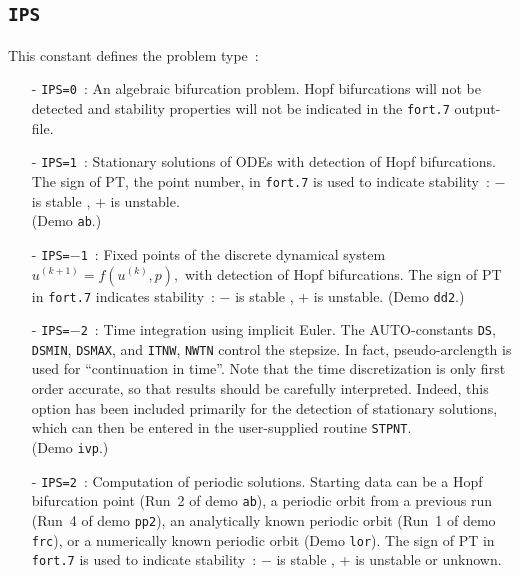 \documentclass[12pt]{report}
\begin{document}
\subsection{\tt IPS}  \label{sec:IPS}
This constant defines the problem type~:
\begin{itemize}
\item[-] {\tt IPS=0}~: 
  An algebraic bifurcation problem.
  Hopf bifurcations will not be detected and stability
  properties will not be indicated in the {\tt fort.7} output-file.
\item[-] {\tt IPS=1}~: 
  Stationary solutions of ODEs with detection of Hopf bifurcations.
  The sign of PT, the point number, in {\tt fort.7} is used 
  to indicate stability~: $-$ is stable , + is unstable.\\
 (Demo {\tt ab}.)
\item[-] {\tt IPS=$-$1}~:  
  Fixed points of the discrete dynamical system
  $u^{(k+1)}=f(u^{(k)},p ),$ with detection of Hopf bifurcations.
  The sign of PT in {\tt fort.7} indicates stability~: 
  $-$ is stable , + is unstable.  
 (Demo {\tt dd2}.)
\item[-] {\tt IPS=$-$2}~: 
  Time integration using implicit Euler. 
  The {\cal AUTO}-constants {\tt DS}, {\tt DSMIN}, {\tt DSMAX}, and {\tt ITNW}, {\tt NWTN} control 
  the stepsize.
  In fact, pseudo-arclength is used for ``continuation in time''. 
  Note that the time discretization is only first order accurate, 
  so that results should be carefully interpreted. 
  Indeed, this option has been included primarily for the detection 
  of stationary solutions, which can then be entered in the user-supplied
  routine {\tt STPNT}.  \\  
 (Demo {\tt ivp}.)
\item[-]  {\tt IPS=2}~:
  Computation of periodic solutions. Starting data can be
  a Hopf bifurcation point (Run~2 of demo {\tt ab}),
  a periodic orbit from a previous run (Run~4 of demo {\tt pp2}),
  an analytically known periodic orbit (Run~1 of demo {\tt frc}),
  or a numerically known periodic orbit (Demo {\tt lor}).
  The sign of PT in {\tt fort.7} is used to indicate
  stability~: $-$ is stable , + is unstable or unknown.

\end{itemize}
\end{document}
